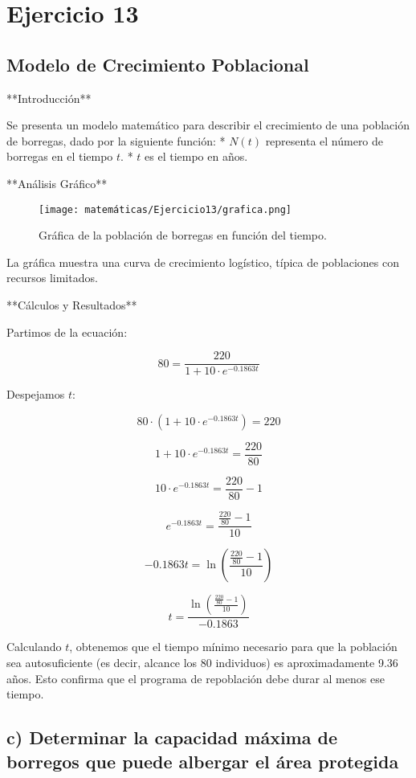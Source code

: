\chapter*{Ejercicio 13}
\section*{Modelo de Crecimiento Poblacional}

    **Introducción**

    Se presenta un modelo matemático para describir el crecimiento de una población de borregas, dado por la siguiente función:
    * $N(t)$ representa el número de borregas en el tiempo $t$.
    * $t$ es el tiempo en años.

    **Análisis Gráfico**

    \begin{figure}[h]
    \centering
    \texttt{[image: matemáticas/Ejercicio13/grafica.png]}
    \caption{Gráfica de la población de borregas en función del tiempo.}
    \end{figure}

    La gráfica muestra una curva de crecimiento logístico, típica de poblaciones con recursos limitados.

    **Cálculos y Resultados**

    Partimos de la ecuación:
    
    \[
    80 = \frac{220}{1 + 10 \cdot e^{-0.1863t}}
    \]
    
    Despejamos \( t \):
    
    \[
    80 \cdot \left(1 + 10 \cdot e^{-0.1863t}\right) = 220
    \]
    
    \[
    1 + 10 \cdot e^{-0.1863t} = \frac{220}{80}
    \]
    
    \[
    10 \cdot e^{-0.1863t} = \frac{220}{80} - 1
    \]
    
    \[
    e^{-0.1863t} = \frac{\frac{220}{80} - 1}{10}
    \]
    
    \[
    -0.1863t = \ln\left(\frac{\frac{220}{80} - 1}{10}\right)
    \]
    
    \[
    t = \frac{\ln\left(\frac{\frac{220}{80} - 1}{10}\right)}{-0.1863}
    \]
    
    Calculando \( t \), obtenemos que el tiempo mínimo necesario para que la población sea autosuficiente (es decir, alcance los 80 individuos) es aproximadamente 9.36 años. Esto confirma que el programa de repoblación debe durar al menos ese tiempo.
    
    \section*{c) Determinar la capacidad máxima de borregos que puede albergar el área protegida}
    
